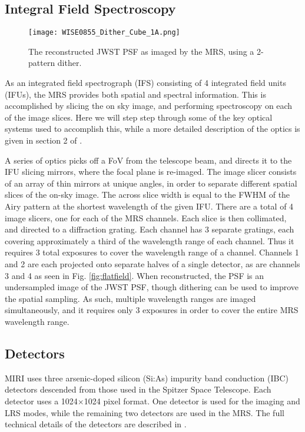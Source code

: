 \subsection{Integral Field Spectroscopy}
\begin{wrapfigure}{r}{5.5cm}
	\vspace{-1em}
	\texttt{[image: WISE0855\_Dither\_Cube\_1A.png]}
	\caption{The reconstructed JWST PSF as imaged by the MRS, using a 2-pattern dither.}
	\label{fig:miripsf}
\end{wrapfigure}
As an integrated field spectrograph (IFS) consisting of 4 integrated field units (IFUs), the MRS provides both spatial and spectral information.
This is accomplished by slicing the on sky image, and performing spectroscopy on each of the image slices. 
Here we will step step through some of the key optical systems used to accomplish this, while a more detailed description of the optics is given in section 2 of \parencite{MIRI6}.

A series of optics picks off a FoV from the telescope beam, and directs it to the IFU slicing mirrors, where the focal plane is re-imaged. 
The image slicer consists of an array of thin mirrors at unique angles, in order to separate different spatial slices of the on-sky image.
The across slice width is equal to the FWHM of the Airy pattern at the shortest wavelength of the given IFU.
There are a total of 4 image slicers, one for each of the MRS channels.
Each slice is then collimated, and directed to a diffraction grating. 
Each channel has 3 separate gratings, each covering approximately a third of the wavelength range of each channel. 
Thus it requires 3 total exposures to cover the wavelength range of a channel.
Channels 1 and 2 are each projected onto separate halves of a single detector, as are channels 3 and 4 as seen in Fig. \ref{fig:flatfield}.
When reconstructed, the PSF is an undersampled image of the JWST PSF, though dithering can be used to improve the spatial sampling.
As such, multiple wavelength ranges are imaged simultaneously, and it requires only 3 exposures in order to cover the entire MRS wavelength range. 
\subsection{Detectors}
MIRI uses three arsenic-doped silicon (Si:As) impurity band conduction (IBC) detectors descended from those used in the Spitzer Space Telescope.
Each detector uses a 1024$\times$1024 pixel format.
One detector is used for the imaging and LRS modes, while the remaining two detectors are used in the MRS.
The full technical details of the detectors are described in \parencite{MIRI7}.

